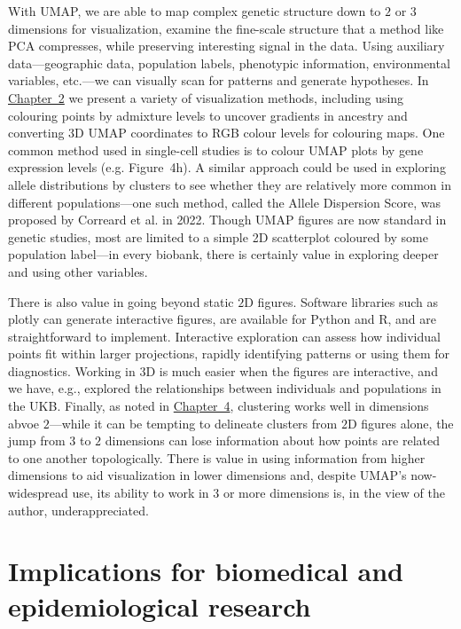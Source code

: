 With UMAP, we are able to map complex genetic structure down to $2$ or $3$ dimensions for visualization, examine the fine-scale structure that a method like PCA compresses, while preserving interesting signal in the data. Using auxiliary data---geographic data, population labels, phenotypic information, environmental variables, etc.---we can visually scan for patterns and generate hypotheses. In \hyperref[chap:chapter2]{Chapter~2} we present a variety of visualization methods, including using colouring points by admixture levels to uncover gradients in ancestry and converting 3D UMAP coordinates to RGB colour levels for colouring maps. One common method used in single-cell studies is to colour UMAP plots by gene expression levels (e.g. \citep{jessa_stalled_2019} Figure~4h). A similar approach could be used in exploring allele distributions by clusters to see whether they are relatively more common in different populations---one such method, called the Allele Dispersion Score, was proposed by Correard et al. in 2022\citep{correard_allele_2022}. Though UMAP figures are now standard in genetic studies, most are limited to a simple 2D scatterplot coloured by some population label---in every biobank, there is certainly value in exploring deeper and using other variables.

There is also value in going beyond static $2$D figures. Software libraries such as plotly\citep{plotly} can generate interactive figures, are available for Python and R, and are straightforward to implement. Interactive exploration can assess how individual points fit within larger projections, rapidly identifying patterns or using them for diagnostics. Working in $3$D is much easier when the figures are interactive, and we have, e.g., explored the relationships between individuals and populations in the UKB. Finally, as noted in \hyperref[chap:chapter4]{Chapter~4}, clustering works well in dimensions abvoe $2$---while it can be tempting to delineate clusters from $2$D figures alone, the jump from $3$ to $2$ dimensions can lose information about how points are related to one another topologically. There is value in using information from higher dimensions to aid visualization in lower dimensions and, despite UMAP's now-widespread use, its ability to work in $3$ or more dimensions is, in the view of the author, underappreciated.

\section{Implications for biomedical and epidemiological research}

